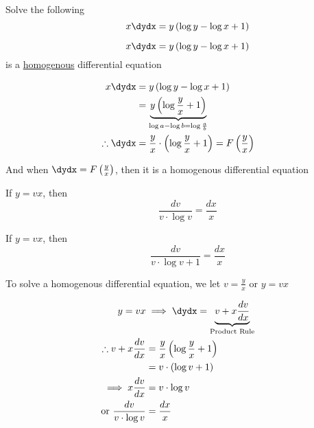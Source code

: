 \documentclass[14pt,fleqn]{extarticle}
\newcommand\yx{\frac{y}{x}}
\begin{document}
 
\begin{problem}
	\statement 
    
     Solve the following 
     \[ \qquad x\dydx = y \left(\log y - \log x + 1 \right)\] 
     
    \begin{step}
  \begin{options} 
     \correct 
       
     \[ \qquad x\dydx = y \left(\log y - \log x + 1 \right)\]
     is a \underline{homogenous} differential equation 
        
    \end{options} 
     \reason 
     
     \begin{align}
	x\dydx &= y \left(\log y - \log x + 1 \right) \\
	&= \underbrace{y \left(\log \yx + 1 \right)}_{\log a - \log b = \log \frac{a}{b}} \\
	\therefore \dydx &= \yx\cdot \left(\log\yx + 1 \right) = F \left(\yx \right)
\end{align}

And when $\dydx = F \left(\yx \right)$, then it is a homogenous differential equation
       
\end{step}

\begin{step}
  \begin{options} 
     \correct 
       
      If $y = vx$, then 
      \[ \qquad \frac{dv}{v\cdot\log v} = \frac{dx}{x} \] 
     \incorrect
     
     If $y = vx$, then 
      \[ \qquad \frac{dv}{v\cdot\log v + 1} = \frac{dx}{x} \] 
        
    \end{options} 
     \reason 
     
     To solve a homogenous differential equation, we let $v = \yx$ or $y = vx$ 
     
     \begin{align}
     y = vx &\implies \dydx = \underbrace{v + x\frac{dv}{dx}}_{\text{Product Rule}} \\
     \therefore v + x\frac{dv}{dx} &= \yx \left(\log\yx + 1 \right) \\
     &= v\cdot \left(\log v + 1 \right) \\
     \implies x\frac{dv}{dx} &= v\cdot\log v \\
     \text{or } \frac{dv}{v\cdot\log v} &= \frac{dx}{x} 
\end{align}
       

\end{step}
\end{problem}
\end{document}

